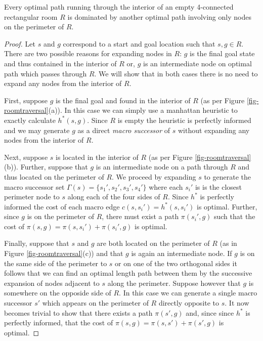 \begin{mylemma}
\label{thm-roomtraversal}
Every optimal path running through the interior of an empty 4-connected rectangular 
room $R$ is dominated by another 
optimal path involving only nodes on the perimeter of $R$.
\end{mylemma}
\begin{proof}
Let $s$ and $g$ correspond to a start and goal location such that $s, g \in R$.
There are two possible reasons for expanding nodes in $R$: 
$g$ is the final goal state and thus contained in the interior of $R$ or,
$g$ is an intermediate node on optimal path which passes through $R$.
We will show that in both cases there is no need to expand any nodes from the interior of $R$.
\par
First, suppose $g$ is the final goal and found in the interior of $R$ 
(as per Figure \ref{fig-roomtraversal}(a)).
In this case we can simply use a manhattan heuristic to exactly calculate $h^*(s, g)$.
Since $R$ is empty the heuristic is perfectly informed and we may generate $g$
as a direct \emph{macro successor} of $s$ without expanding any nodes from the interior of $R$.
\par
Next, suppose $s$ is located in the interior of $R$ (as per Figure \ref{fig-roomtraversal}(b)).
Further, suppose that $g$ is an intermediate node on a path through $R$ and thus
located on the perimeter of $R$.
We proceed by expanding $s$ to generate the macro successor set 
$\Gamma(s) = \lbrace s_{1}', s_{2}', s_{3}', s_{4}'\rbrace$ where each $s_{i}'$ is 
is the closest perimeter node to $s$ along each of the four sides of $R$.
Since $h^*$ is perfectly informed the cost of each macro edge 
$c(s, s_{i}') = h^*(s, s_{i}')$ is optimal.
Further, since $g$ is on the perimeter of $R$, there must exist a path $\pi(s_{i}', g)$ 
such that the cost of $\pi(s, g) = \pi(s, s_{i}') + \pi(s_{i}', g)$ is optimal.
\par
Finally, suppose that $s$ and $g$ are both located on the perimeter of $R$ 
(as in Figure \ref{fig-roomtraversal}(c)) and that $g$ is again an intermediate node.
If $g$ is on the same side of the perimeter to $s$ or on one of the two orthogonal sides 
it follows that we can find an optimal length path between them by the successive expansion of 
nodes adjacent to $s$ along the perimeter.
Suppose however that $g$ is somewhere on the opposide side of $R$.
In this case we can generate a single macro successor $s'$ which appears on the 
perimeter of $R$ directly opposite to $s$.
It now becomes trivial to show that there exists a path $\pi(s',g)$ and, 
since since $h^*$ is perfectly informed, that the cost of  
$\pi(s, g) = \pi(s, s') + \pi(s', g)$ is optimal.
\end{proof}

